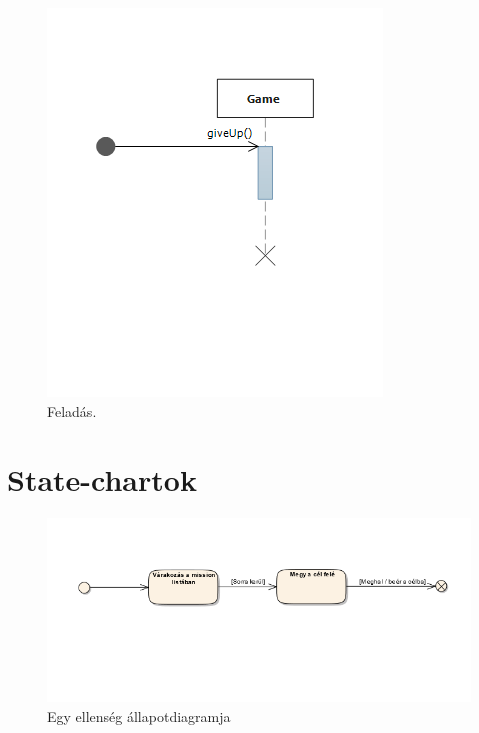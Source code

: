 \begin{figure}[H]
\begin{center}
\includegraphics{images/giving_up.png}
\caption{Feladás.}
\label{fig:giving_up}
\end{center}
\end{figure}


\pagebreak
\section{State-chartok}

\begin{figure}[H]
\begin{center}
\includegraphics[width=15cm]{images/ch04/enemy_state.png}
\caption{Egy ellenség állapotdiagramja}
\label{fig:enemy_state}
\end{center}
\end{figure}


